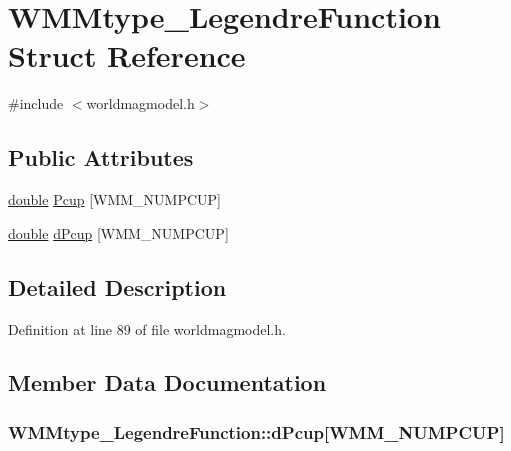 \hypertarget{struct_w_m_mtype___legendre_function}{\section{W\-M\-Mtype\-\_\-\-Legendre\-Function Struct Reference}
\label{struct_w_m_mtype___legendre_function}
}


{\ttfamily \#include $<$worldmagmodel.\-h$>$}

\subsection*{Public Attributes}
\begin{DoxyCompactItemize}
\item 
\hyperlink{_super_l_u_support_8h_a8956b2b9f49bf918deed98379d159ca7}{double} \hyperlink{struct_w_m_mtype___legendre_function_a5badc4162d0641c9de51a11bf49d2f71}{Pcup} \mbox{[}W\-M\-M\-\_\-\-N\-U\-M\-P\-C\-U\-P\mbox{]}
\item 
\hyperlink{_super_l_u_support_8h_a8956b2b9f49bf918deed98379d159ca7}{double} \hyperlink{struct_w_m_mtype___legendre_function_a671f898b60683a35dfd5c622dfee1cf7}{d\-Pcup} \mbox{[}W\-M\-M\-\_\-\-N\-U\-M\-P\-C\-U\-P\mbox{]}
\end{DoxyCompactItemize}


\subsection{Detailed Description}


Definition at line 89 of file worldmagmodel.\-h.



\subsection{Member Data Documentation}
\hypertarget{struct_w_m_mtype___legendre_function_a671f898b60683a35dfd5c622dfee1cf7}{
\subsubsection[{d\-Pcup}]{ W\-M\-Mtype\-\_\-\-Legendre\-Function\-::d\-Pcup\mbox{[}W\-M\-M\-\_\-\-N\-U\-M\-P\-C\-U\-P\mbox{]}}}\label{struct_w_m_mtype___legendre_function_a671f898b60683a35dfd5c622dfee1cf7}


